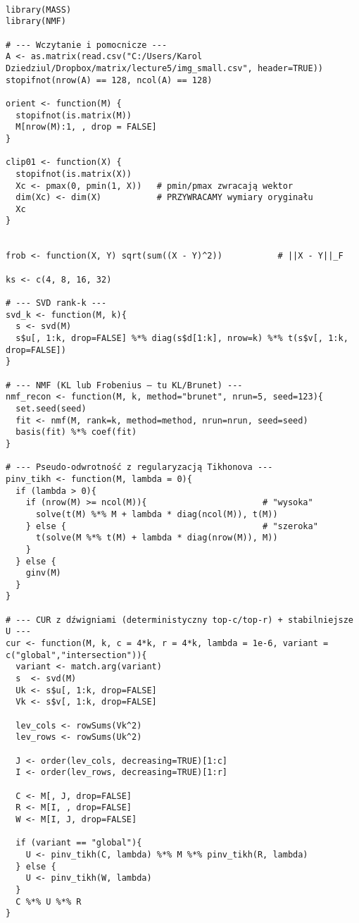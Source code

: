 \documentclass[12pt]{article}
\begin{document}
\begin{verbatim}

library(MASS)
library(NMF)

# --- Wczytanie i pomocnicze ---
A <- as.matrix(read.csv("C:/Users/Karol Dziedziul/Dropbox/matrix/lecture5/img_small.csv", header=TRUE))
stopifnot(nrow(A) == 128, ncol(A) == 128)

orient <- function(M) {
  stopifnot(is.matrix(M))
  M[nrow(M):1, , drop = FALSE]
}

clip01 <- function(X) {
  stopifnot(is.matrix(X))
  Xc <- pmax(0, pmin(1, X))   # pmin/pmax zwracają wektor
  dim(Xc) <- dim(X)           # PRZYWRACAMY wymiary oryginału
  Xc
}


frob <- function(X, Y) sqrt(sum((X - Y)^2))           # ||X - Y||_F

ks <- c(4, 8, 16, 32)

# --- SVD rank-k ---
svd_k <- function(M, k){
  s <- svd(M)
  s$u[, 1:k, drop=FALSE] %*% diag(s$d[1:k], nrow=k) %*% t(s$v[, 1:k, drop=FALSE])
}

# --- NMF (KL lub Frobenius – tu KL/Brunet) ---
nmf_recon <- function(M, k, method="brunet", nrun=5, seed=123){
  set.seed(seed)
  fit <- nmf(M, rank=k, method=method, nrun=nrun, seed=seed)
  basis(fit) %*% coef(fit)
}

# --- Pseudo-odwrotność z regularyzacją Tikhonova ---
pinv_tikh <- function(M, lambda = 0){
  if (lambda > 0){
    if (nrow(M) >= ncol(M)){                       # "wysoka"
      solve(t(M) %*% M + lambda * diag(ncol(M)), t(M))
    } else {                                       # "szeroka"
      t(solve(M %*% t(M) + lambda * diag(nrow(M)), M))
    }
  } else {
    ginv(M)
  }
}

# --- CUR z dźwigniami (deterministyczny top-c/top-r) + stabilniejsze U ---
cur <- function(M, k, c = 4*k, r = 4*k, lambda = 1e-6, variant = c("global","intersection")){
  variant <- match.arg(variant)
  s  <- svd(M)
  Uk <- s$u[, 1:k, drop=FALSE]
  Vk <- s$v[, 1:k, drop=FALSE]

  lev_cols <- rowSums(Vk^2)
  lev_rows <- rowSums(Uk^2)

  J <- order(lev_cols, decreasing=TRUE)[1:c]
  I <- order(lev_rows, decreasing=TRUE)[1:r]

  C <- M[, J, drop=FALSE]
  R <- M[I, , drop=FALSE]
  W <- M[I, J, drop=FALSE]

  if (variant == "global"){
    U <- pinv_tikh(C, lambda) %*% M %*% pinv_tikh(R, lambda)
  } else {
    U <- pinv_tikh(W, lambda)
  }
  C %*% U %*% R
}


\end{verbatim}
\end{document}

